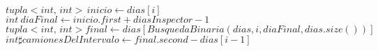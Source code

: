 
\begin{algorithmic}[1]
	
	\State $tupla<int, \,int> \, inicio \gets dias[i]$
	\State $int \: diaFinal \gets inicio.first + diasInspector -1$
	\State $tupla<int, \, int> final \gets dias[BusquedaBinaria(dias,i, diaFinal, dias.size())]$
	\State $int \sharp camionesDelIntervalo \gets final.second - dias[i-1]$
	
	\end{algorithmic}